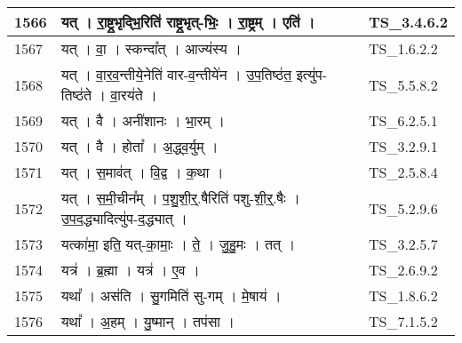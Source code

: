 \documentclass[17pt]{extarticle}
\begin{document}
\begin{longtable}{||p{0.4in}||p{4.9in}||p{0.9in}||}
    \hline
        
    1566 & यत्   ।   रा॒ष्ट्र॒भृद्भि॒रिति॑ राष्ट्र॒भृत्{-}भिः॒   ।   रा॒ष्ट्रम्   ।   एति॑   ।    & TS\_3.4.6.2       \\
    
    \hline
        
    1567 & यत्   ।   वा॒   ।   स्कन्दा᳚त्   ।   आज्य॑स्य   ।    & TS\_1.6.2.2       \\
    
    \hline
        
    1568 & यत्   ।   वा॒र॒व॒न्तीये॒नेति॑ वार{-}व॒न्तीये॑न   ।   उ॒प॒तिष्ठ॑त॒ इत्यु॑प{-}तिष्ठ॑ते   ।   वा॒रय॑ते   ।    & TS\_5.5.8.2       \\
    
    \hline
        
    1569 & यत्   ।   वै   ।   अनी॑शानः   ।   भा॒रम्   ।    & TS\_6.2.5.1       \\
    
    \hline
        
    1570 & यत्   ।   वै   ।   होता᳚   ।   अ॒द्ध्व॒र्युम्   ।    & TS\_3.2.9.1       \\
    
    \hline
        
    1571 & यत्   ।   स॒माव॑त्   ।   वि॒द्व   ।   क॒था   ।    & TS\_2.5.8.4       \\
    
    \hline
        
    1572 & यत्   ।   स॒मी॒चीन᳚म्   ।   प॒शु॒शी॒र्॒.षैरिति॑ पशु{-}शी॒र्॒.षैः   ।   उ॒प॒द॒द्ध्यादित्यु॑प{-}द॒द्ध्यात्   ।    & TS\_5.2.9.6       \\
    
    \hline
        
    1573 & यत्का॑मा॒ इति॒ यत्{-}का॒माः॒   ।   ते॒   ।   जु॒हु॒मः   ।   तत्   ।    & TS\_3.2.5.7       \\
    
    \hline
        
    1574 & यत्र॑   ।   ब्र॒ह्मा   ।   यत्र॑   ।   ए॒व   ।    & TS\_2.6.9.2       \\
    
    \hline
        
    1575 & यथा᳚   ।   अस॑ति   ।   सु॒गमिति॑ सु{-}गम्   ।   मे॒षाय॑   ।    & TS\_1.8.6.2       \\
    
    \hline
        
    1576 & यथा᳚   ।   अ॒हम्   ।   यु॒ष्मान्   ।   तप॑सा   ।    & TS\_7.1.5.2       \\
    

\end{longtable}
\end{document}
